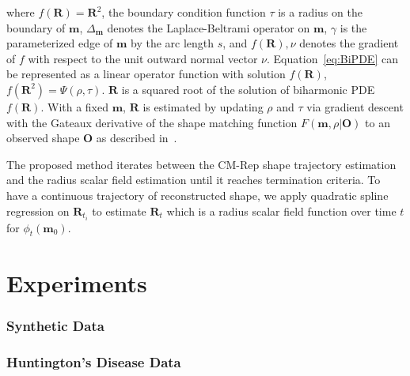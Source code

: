 \documentclass{llncs}
\begin{document}
where $f(\mathbf{R}) = \mathbf{R}^2$, the boundary condition function $\tau$ is a radius on the boundary of $\mathbf{m}$, $\Delta_{\mathbf{m}}$ denotes the Laplace-Beltrami operator on $\mathbf{m}$, $\gamma$ is the parameterized edge of $\mathbf{m}$ by the arc length $s$, and $f(\mathbf{R}), \nu$ denotes the gradient of $f$ with respect to the unit outward normal vector $\nu$. 
Equation~\ref{eq:BiPDE} can be represented as a linear operator function with solution $f(\mathbf{R})$, $f(\mathbf{R}^2) = \Psi( \rho, \tau)$.
$\mathbf{R}$ is a squared root of the solution of biharmonic PDE $f(\mathbf{R})$. 
With a fixed $\mathbf{m}$, $\mathbf{R}$ is estimated by updating $\rho$ and $\tau$ via gradient descent with the Gateaux derivative of the shape matching function $F( \mathbf{m}, \rho | \mathbf{O})$ to an observed shape $\mathbf{O}$ as described in~\cite{Yushkevich2006}.

The proposed method iterates between the CM-Rep shape trajectory estimation and the radius scalar field estimation until it reaches termination criteria. 
To have a continuous trajectory of reconstructed shape, we apply quadratic spline regression on $\mathbf{R}_{t_i}$ to estimate $\mathbf{R}_t$ which is a radius scalar field function over time $t$ for $\phi_t(\mathbf{m}_0)$. 

\section{Experiments}
\label{sec:Exp}

\subsubsection{Synthetic Data}
\label{ssec:Synthetic}



\subsubsection{Huntington's Disease Data}
\label{ssec:HD}
\end{document}
